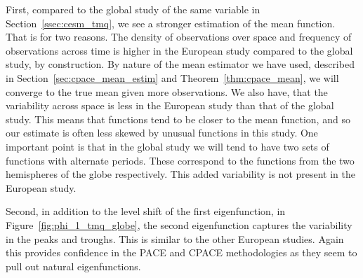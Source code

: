 First, compared to the global study of the same variable in Section~\ref{ssec:cesm_tmq}, we see a stronger estimation of the mean function.
That is for two reasons.
The density of observations over space and frequency of observations across time is higher in the European study compared to the global study, by construction.
By nature of the mean estimator we have used, described in Section~\ref{sec:cpace_mean_estim} and Theorem~\ref{thm:cpace_mean}, we will converge to the true mean given more observations.
We also have, that the variability across space is less in the European study than that of the global study.
This means that functions tend to be closer to the mean function, and so our estimate is often less skewed by unusual functions in this study.
One important point is that in the global study we will tend to have two sets of functions with alternate periods.
These correspond to the functions from the two hemispheres of the globe respectively.
This added variability is not present in the European study.

Second, in addition to the level shift of the first eigenfunction, in Figure~\ref{fig:phi_1_tmq_globe}, the second eigenfunction captures the variability in the peaks and troughs.
This is similar to the other European studies.
Again this provides confidence in the PACE and CPACE methodologies as they seem to pull out natural eigenfunctions.

